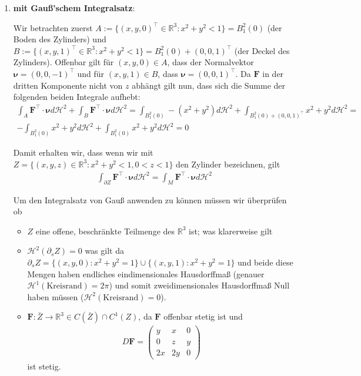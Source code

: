 \documentclass[]{article}
\begin{document}
\begin{enumerate}[label=(\roman*)]
	\item \textbf{mit Gauß'schem Integralsatz}:

	Wir betrachten zuerst $A:=\{(x,y,0)^\top\in \mathbb{R}^3: x^2+y^2 < 1\} = B_1^2(0)$ (der Boden des Zylinders) und $B:=\{(x,y,1)^\top \in \mathbb{R}^3: x^2+y^2 < 1\} = B_1^2(0)+(0,0,1)^\top$ (der Deckel des Zylinders). Offenbar gilt für $(x,y,0) \in A$, dass der Normalvektor $\bm{\nu} = (0,0,-1)^\top$ und für $(x,y,1) \in B$, dass $\bm{\nu} = (0,0,1)^\top$. Da $\bm{F}$ in der dritten Komponente nicht von $z$ abhängt gilt nun, dass sich die Summe der folgenden beiden Integrale aufhebt:
	\begin{align*}
		\int_A \bm{F}^\top \cdot \bm{\nu} d\mathcal{H}^2 + \int_B \bm{F}^\top \cdot \bm{\nu} d\mathcal{H}^2 = \int_{B_1^2(0)} -(x^2+y^2) d\mathcal{H}^2 + \int_{B_1^2(0)+(0,0,1)^\top} x^2+y^2 d\mathcal{H}^2 = \\
		-\int_{B_1^2(0)} x^2+y^2 d\mathcal{H}^2 + \int_{B_1^2(0)} x^2+y^2 d\mathcal{H}^2 = 0
	\end{align*}

	Damit erhalten wir, dass wenn wir mit $Z=\{(x,y,z)\in \mathbb{R}^3: x^2+y^2 < 1, 0<z<1\}$ den Zylinder bezeichnen, gilt
	\begin{align*}
		\int_{\partial Z} \bm{F}^\top \cdot \bm{\nu} d\mathcal{H}^2 = \int_M \bm{F}^\top \cdot \bm{\nu} d\mathcal{H}^2
	\end{align*}

	Um den Integralsatz von Gauß anwenden zu können müssen wir überprüfen ob
	\begin{itemize}
		\item $Z$ eine offene, beschränkte Teilmenge des $\mathbb{R}^3$ ist; was klarerweise gilt
		\item $\mathcal{H}^2(\partial_sZ)=0$ was gilt da $\partial_sZ = \{(x,y,0): x^2+y^2=1\} \cup \{(x,y,1): x^2+y^2=1\}$ und beide diese Mengen haben endliches eindimensionales Hausdorffmaß (genauer $\mathcal{H}^1(\text{Kreisrand})=2\pi$) und somit zweidimensionales Hausdorffmaß Null haben müssen ($\mathcal{H}^2(\text{Kreisrand})=0$).
		\item $\bm{F}:\bar{Z} \rightarrow \mathbb{R}^3 \in C(\bar{Z}) \cap C^1(Z)$, da $\bm{F}$ offenbar stetig ist und
		\begin{align*}
			D\bm{F} = \begin{pmatrix}
				y & x & 0\\ 0 & z & y\\ 2x & 2y & 0
			\end{pmatrix}
		\end{align*}
		ist stetig.
	\end{itemize}
	

\end{enumerate}
\end{document}
